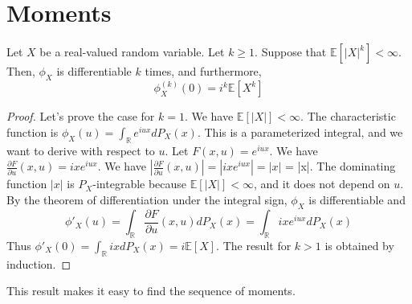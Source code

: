 \section{Moments}%
\begin{proposition}
Let $X$ be a real-valued random variable. Let $k \geq 1$. Suppose that $\mathbb{E}[|X|^k] < \infty$.
Then, $\phi_X$ is differentiable $k$ times, and furthermore,
\[ \phi_X^{(k)}(0) = i^k \mathbb{E}[X^k] \]
\end{proposition}%
\begin{proof}
Let's prove the case for $k=1$. We have $\mathbb{E}[|X|] < \infty$.
The characteristic function is $\phi_X(u) = \int_{\mathbb{R}} e^{iux} dP_X(x)$.
This is a parameterized integral, and we want to derive with respect to $u$.
Let $F(x,u) = e^{iux}$. We have $\frac{\partial F}{\partial u}(x,u) = ix e^{iux}$.
We have $\left|\frac{\partial F}{\partial u}(x,u)\right| = |ix e^{iux}| = |x|$ = |x|.
The dominating function $|x|$ is $P_X$-integrable because $\mathbb{E}[|X|] < \infty$, and it does not depend on $u$.
By the theorem of differentiation under the integral sign, $\phi_X$ is differentiable and
\[ \phi'_X(u) = \int_{\mathbb{R}} \frac{\partial F}{\partial u}(x,u) dP_X(x) = \int_{\mathbb{R}} ix e^{iux} dP_X(x) \]
Thus $\phi'_X(0) = \int_{\mathbb{R}} ix dP_X(x) = i \mathbb{E}[X]$.
The result for $k > 1$ is obtained by induction.
\end{proof}%
This result makes it easy to find the sequence of moments.%
